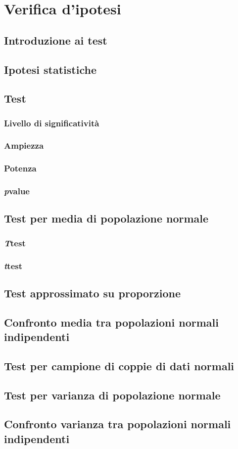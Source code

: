 
\chapter{Verifica d'ipotesi}
    \section{Introduzione ai test}
    \section{Ipotesi statistiche}
    \section{Test}
        \subsection{Livello di significatività}
        \subsection{Ampiezza}
        \subsection{Potenza}
        \subsection{\emph{p}\nbdash value}
    \section{Test per media di popolazione normale}
        \subsection{\emph{T}\nbdash test}
        \subsection{\emph{t}\nbdash test}
    \section{Test approssimato su proporzione}
    \section{Confronto media tra popolazioni normali indipendenti}
    \section{Test per campione di coppie di dati normali}
    \section{Test per varianza di popolazione normale}
    \section{Confronto varianza tra popolazioni normali indipendenti}
